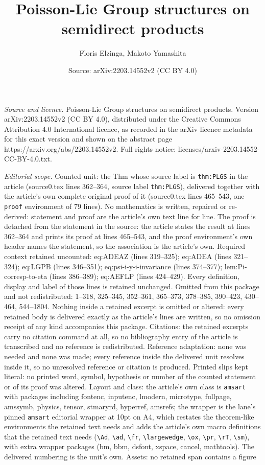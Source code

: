 \documentclass[10pt,a4paper]{amsart}
\title[Poisson-Lie Group structures on semidirect products]{Poisson-Lie Group structures on semidirect products}
\author{Floris Elzinga, Makoto Yamashita}
\date{Source: arXiv:2203.14552v2 (CC BY 4.0)}
\begin{document}
\maketitle

\noindent\emph{Source and licence.} Poisson-Lie Group structures on semidirect products. Version arXiv:2203.14552v2 (CC BY 4.0), distributed under the Creative Commons Attribution 4.0 International licence, as recorded in the arXiv licence metadata for this exact version and shown on the abstract page https://arxiv.org/abs/2203.14552v2. Full rights notice: licenses/arxiv-2203.14552-CC-BY-4.0.txt.\par\smallskip

\noindent\textit{Editorial scope.} Counted unit: the Thm whose source label is \texttt{thm:PLGS} in the article (source0.tex lines 362--364, source label \texttt{thm:PLGS}), delivered together with the article's own complete original proof of it (source0.tex lines 465--543, one \texttt{proof} environment of 79 lines). No mathematics is written, repaired or re-derived: statement and proof are the article's own text line for line. The proof is detached from the statement in the source: the article states the result at lines 362--364 and prints its proof at lines 465--543, and the proof environment's own header names the statement, so the association is the article's own. Required context retained uncounted: eq:ADEAZ (lines 319--325); eq:ADEA (lines 321--324); eq:LGPB (lines 346--351); eq:psi-i-y-i-invariance (lines 374--377); lem:Pi-corresp-to-eta (lines 386--389); eq:AEFLP (lines 424--429). Every definition, display and label of those lines is retained unchanged. Omitted from this package and not redistributed: 1--318, 325--345, 352--361, 365--373, 378--385, 390--423, 430--464, 544--1804. Nothing inside a retained excerpt is omitted or altered: every retained body is delivered exactly as the article's lines are written, so no omission receipt of any kind accompanies this package. Citations: the retained excerpts carry no citation command at all, so no bibliography entry of the article is transcribed and no reference is redistributed. Reference adaptation: none was needed and none was made; every reference inside the delivered unit resolves inside it, so no unresolved reference or citation is produced. Printed slips kept literal: no printed word, symbol, hypothesis or number of the counted statement or of its proof was altered. Layout and class: the article's own class is \texttt{amsart} with packages including fontenc, inputenc, lmodern, microtype, fullpage, amssymb, physics, tensor, stmaryrd, hyperref, amsrefs; the wrapper is the lane's pinned \texttt{amsart} editorial wrapper at 10pt on A4, which restates the theorem-like environments the retained text needs and adds the article's own macro definitions that the retained text needs (\texttt{\textbackslash Ad}, \texttt{\textbackslash ad}, \texttt{\textbackslash fr}, \texttt{\textbackslash largewedge}, \texttt{\textbackslash ox}, \texttt{\textbackslash pr}, \texttt{\textbackslash rT}, \texttt{\textbackslash sm}), with extra wrapper packages (bm, bbm, dsfont, xspace, cancel, mathtools). The delivered numbering is the unit's own. Assets: no retained span contains a figure 
\end{document}

